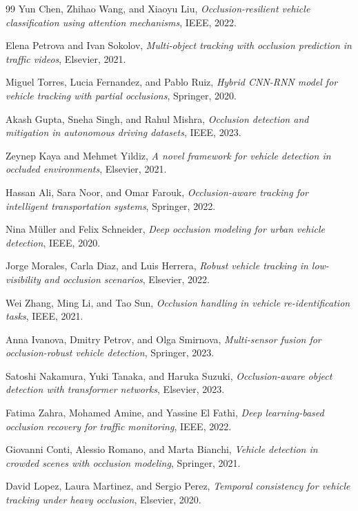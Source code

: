 \documentclass[12pt,a4paper]{report}
\theoremstyle{definition}
\theoremstyle{remark}
\begin{document}
\begin{thebibliography}{99}
	Yun Chen, Zhihao Wang, and Xiaoyu Liu,
	\emph{Occlusion-resilient vehicle classification using attention mechanisms},
	IEEE, 2022.

	Elena Petrova and Ivan Sokolov,
	\emph{Multi-object tracking with occlusion prediction in traffic videos},
	Elsevier, 2021.

	Miguel Torres, Lucia Fernandez, and Pablo Ruiz,
	\emph{Hybrid CNN-RNN model for vehicle tracking with partial occlusions},
	Springer, 2020.

	Akash Gupta, Sneha Singh, and Rahul Mishra,
	\emph{Occlusion detection and mitigation in autonomous driving datasets},
	IEEE, 2023.

	Zeynep Kaya and Mehmet Yildiz,
	\emph{A novel framework for vehicle detection in occluded environments},
	Elsevier, 2021.

	Hassan Ali, Sara Noor, and Omar Farouk,
	\emph{Occlusion-aware tracking for intelligent transportation systems},
	Springer, 2022.

	Nina Müller and Felix Schneider,
	\emph{Deep occlusion modeling for urban vehicle detection},
	IEEE, 2020.

	Jorge Morales, Carla Diaz, and Luis Herrera,
	\emph{Robust vehicle tracking in low-visibility and occlusion scenarios},
	Elsevier, 2022.

	Wei Zhang, Ming Li, and Tao Sun,
	\emph{Occlusion handling in vehicle re-identification tasks},
	IEEE, 2021.

	Anna Ivanova, Dmitry Petrov, and Olga Smirnova,
	\emph{Multi-sensor fusion for occlusion-robust vehicle detection},
	Springer, 2023.

	Satoshi Nakamura, Yuki Tanaka, and Haruka Suzuki,
	\emph{Occlusion-aware object detection with transformer networks},
	Elsevier, 2023.

	Fatima Zahra, Mohamed Amine, and Yassine El Fathi,
	\emph{Deep learning-based occlusion recovery for traffic monitoring},
	IEEE, 2022.

	Giovanni Conti, Alessio Romano, and Marta Bianchi,
	\emph{Vehicle detection in crowded scenes with occlusion modeling},
	Springer, 2021.

	David Lopez, Laura Martinez, and Sergio Perez,
	\emph{Temporal consistency for vehicle tracking under heavy occlusion},
	Elsevier, 2020.


\end{thebibliography}
\end{document}
